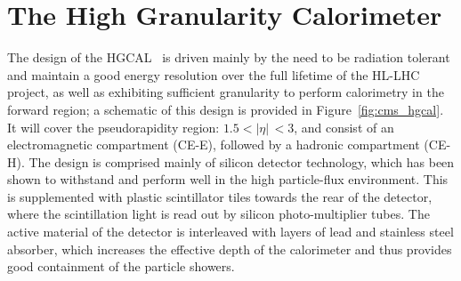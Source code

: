 \section{The High Granularity Calorimeter}\label{sec:hgcal}
The design of the HGCAL~\cite{CERN-LHCC-2017-023} is driven mainly by the need to be radiation tolerant and maintain a good energy resolution over the full lifetime of the HL-LHC project, as well as exhibiting sufficient granularity to perform calorimetry in the forward region; a schematic of this design is provided in Figure~\ref{fig:cms_hgcal}. It will cover the pseudorapidity region: $1.5<|\eta|\,<3$, and  consist of an electromagnetic compartment (CE-E), followed by a hadronic compartment (CE-H). The design is comprised mainly of silicon detector technology, which has been shown to withstand and perform well in the high particle-flux environment. This is supplemented with plastic scintillator tiles towards the rear of the detector, where the scintillation light is read out by silicon photo-multiplier tubes. The active material of the detector is interleaved with layers of lead and stainless steel absorber, which increases the effective depth of the calorimeter and thus provides good containment of the particle showers.

